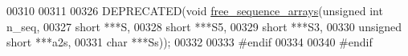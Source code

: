 \begin{DoxyCode}
00310 
00311 
00326 DEPRECATED(\textcolor{keywordtype}{void}  \hyperlink{group__aln__utils_ga298a420a8c879202e2617b3f724fde38}{free\_sequence\_arrays}(\textcolor{keywordtype}{unsigned} \textcolor{keywordtype}{int}    n\_seq,
00327                                       \textcolor{keywordtype}{short}           ***S,
00328                                       \textcolor{keywordtype}{short}           ***S5,
00329                                       \textcolor{keywordtype}{short}           ***S3,
00330                                       \textcolor{keywordtype}{unsigned} \textcolor{keywordtype}{short}  ***a2s,
00331                                       \textcolor{keywordtype}{char}            ***Ss));
00332 
00333 \textcolor{preprocessor}{#endif}
00334 
00340 \textcolor{preprocessor}{#endif}
\end{DoxyCode}
